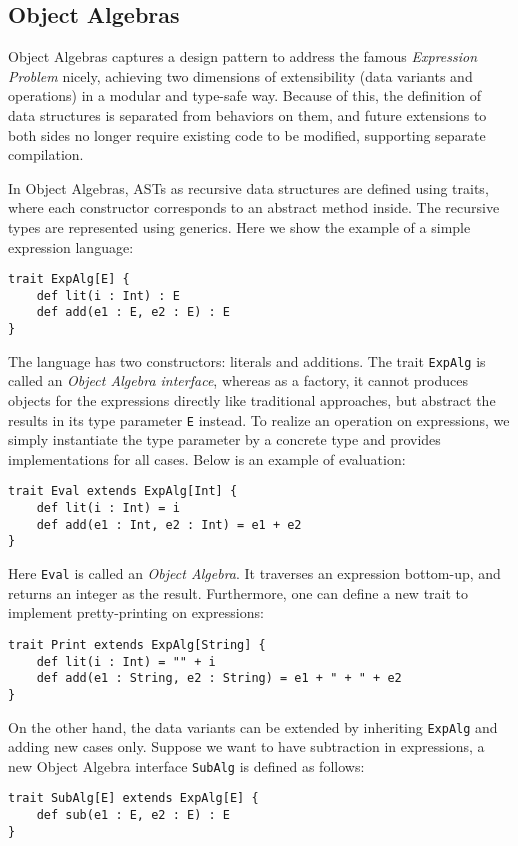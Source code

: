 \subsection{Object Algebras}\label{subsec:objectalgebras}

Object Algebras captures a design pattern to address the famous \textit{Expression Problem} nicely,
achieving two dimensions of extensibility (data variants and operations) in a modular and type-safe way.
Because of this, the definition of data structures is separated from behaviors on them, and future extensions
to both sides no longer require existing code to be modified, supporting separate compilation.

In Object Algebras, ASTs as recursive data structures are defined using traits, where each constructor corresponds
to an abstract method inside. The recursive types are represented using generics. Here we show the example of a simple
expression language:
\begin{lstlisting}
trait ExpAlg[E] {
    def lit(i : Int) : E
    def add(e1 : E, e2 : E) : E
}
\end{lstlisting}
The language has two constructors: literals and additions. The trait \lstinline{ExpAlg} is called an \textit{Object Algebra interface},
whereas as a factory, it cannot produces objects for the expressions directly like traditional approaches, but abstract the results in its
type parameter \lstinline{E} instead. To realize an operation on expressions, we simply instantiate the type parameter by a concrete type and
provides implementations for all cases. Below is an example of evaluation:
\begin{lstlisting}
trait Eval extends ExpAlg[Int] {
    def lit(i : Int) = i
    def add(e1 : Int, e2 : Int) = e1 + e2
}
\end{lstlisting}
Here \lstinline{Eval} is called an \textit{Object Algebra}. It traverses an expression bottom-up, and returns an integer as the result.
Furthermore, one can define a new trait to implement pretty-printing on expressions:
\begin{lstlisting}
trait Print extends ExpAlg[String] {
    def lit(i : Int) = "" + i
    def add(e1 : String, e2 : String) = e1 + " + " + e2
}
\end{lstlisting}
On the other hand, the data variants can be extended by inheriting \lstinline{ExpAlg} and adding new cases only. Suppose we want to
have subtraction in expressions, a new Object Algebra interface \lstinline{SubAlg} is defined as follows:
\begin{lstlisting}
trait SubAlg[E] extends ExpAlg[E] {
    def sub(e1 : E, e2 : E) : E
}
\end{lstlisting}
